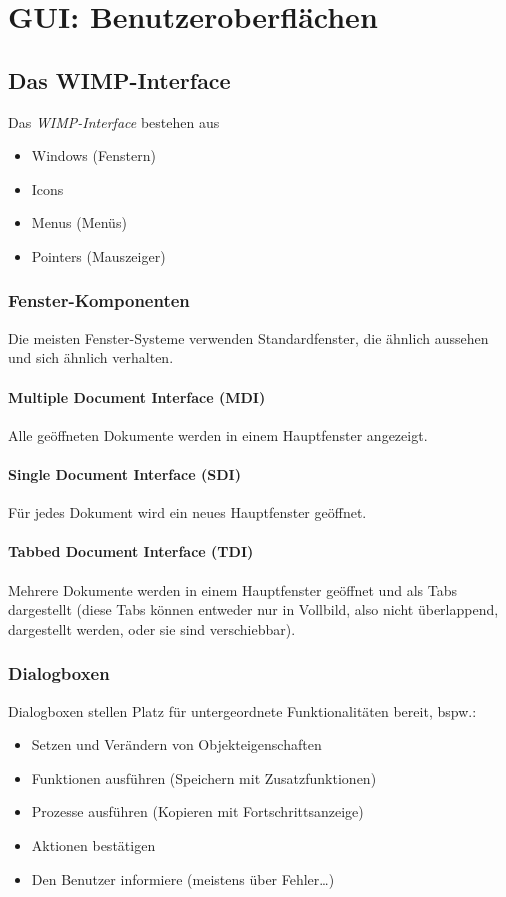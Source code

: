 	\section{GUI: Benutzeroberflächen}
		\subsection{Das WIMP-Interface}
			Das \emph{WIMP-Interface} bestehen aus
			\begin{itemize}
				\item Windows (Fenstern)
				\item Icons
				\item Menus (Menüs)
				\item Pointers (Mauszeiger)
			\end{itemize}

			\subsubsection{Fenster-Komponenten}
				Die meisten Fenster-Systeme verwenden Standardfenster, die ähnlich aussehen und sich ähnlich verhalten.

				\paragraph{Multiple Document Interface (MDI)}
					Alle geöffneten Dokumente werden in einem Hauptfenster angezeigt.

				\paragraph{Single Document Interface (SDI)}
					Für jedes Dokument wird ein neues Hauptfenster geöffnet.

				\paragraph{Tabbed Document Interface (TDI)}
					Mehrere Dokumente werden in einem Hauptfenster geöffnet und als Tabs dargestellt (diese Tabs können entweder nur in Vollbild, also nicht überlappend, dargestellt werden, oder sie sind verschiebbar).

			\subsubsection{Dialogboxen}
				Dialogboxen stellen Platz für untergeordnete Funktionalitäten bereit, bspw.:
				\begin{itemize}
					\item Setzen und Verändern von Objekteigenschaften
					\item Funktionen ausführen (\zB Speichern mit Zusatzfunktionen)
					\item Prozesse ausführen (\zB Kopieren mit Fortschrittsanzeige)
					\item Aktionen bestätigen
					\item Den Benutzer informiere (meistens über Fehler\dots)
				\end{itemize}

